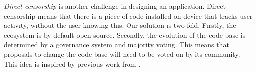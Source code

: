\textit{Direct censorship} is another challenge in designing an application. Direct censorship means that there is a piece of code installed on-device that tracks user activity, without the user knowing this. Our solution is two-fold. Firstly, the ecosystem is by default open source. Secondly, the evolution of the code-base is determined by a governance system and majority voting. This means that proposals to change the code-base will need to be voted on by its community. This idea is inspired by previous work from \cite{jentzsch2016decentralized}.







